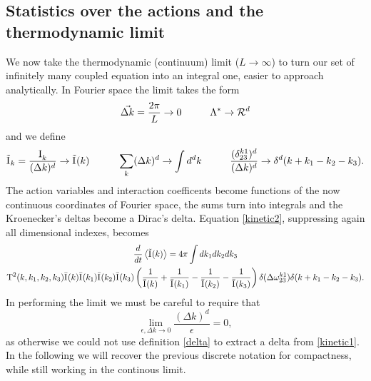 \subsection{Statistics over the actions and the thermodynamic limit}
We now take the thermodynamic (continuum) limit ($L \rightarrow \infty$) to turn our set of infinitely many coupled equation into an integral one, easier to approach analytically.
In Fourier space the limit takes the form 
\begin{equation}
    \vec{\Delta k} = \frac{2\pi}{L} \rightarrow 0 \hspace{10mm} \Lambda^* \rightarrow \mathcal{R}^d
\end{equation}
and we define 
\begin{equation}
    \tilde{\Ia}_k=\frac{\Ia_k}{(\Delta k)^d} \rightarrow \tilde{\Ia}(k) \hspace{10mm} \sum_k (\Delta k)^d \rightarrow \int d^d k \hspace{10mm} 
    \frac{(\delta^{k1}_{23})^d}{(\Delta k)^d} \rightarrow \delta^d(k + k_1 - k_2 - k_3).
\end{equation}
The action variables and interaction coefficents become functions of the now continuous coordinates of Fourier space, the sums turn into integrals and the Kroenecker's deltas become a
Dirac's delta. Equation \eqref{kinetic2}, suppressing again all dimensional indexes, becomes
\begin{multline}
    \frac{d}{dt} \left\langle \tilde{\mathrm{I}^{}}(k)\right\rangle = 4 \pi\int dk_1 dk_2 dk_3 \\
    \mathrm{T}^2(k, k_1, k_2, k_3)\bar{\mathrm{I}^{}}(k)\bar{\mathrm{I}^{}}(k_1)\bar{\mathrm{I}^{}}(k_2)\bar{\mathrm{I}^{}}(k_3)
    \left(\frac{1}{\bar{\mathrm{I}^{}}(k)} + \frac{1}{\bar{\mathrm{I}^{}}(k_1)} - \frac{1}{\bar{\mathrm{I}^{}}(k_2)}- \frac{1}{\bar{\mathrm{I}^{}}(k_3)}  \right)
    \delta(\Delta{\omega}^{k1}_{23})\delta(k + k_1 - k_2 - k_3).
    \label{kinetic3}
\end{multline}
In performing the limit we must be careful to require that 
\begin{equation}
\underset{\epsilon, \Delta k \rightarrow 0}{\lim} \frac{(\Delta k)^d}{\epsilon} = 0 ,
\end{equation}
as otherwise we could not use definition \eqref{delta} to extract a delta from \eqref{kinetic1}. \\
In the following we will recover the previous discrete notation for compactness, while still working in the continous limit.\\

